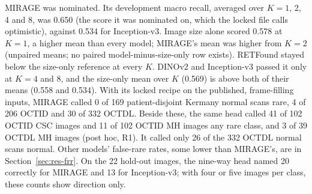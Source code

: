 \documentclass[conference]{IEEEtran}
\begin{document}
MIRAGE was nominated. Its development macro recall, averaged over $K=1$, 2, 4 and 8, was 0.650 (the score it was nominated on, which the locked file calls optimistic), against 0.534 for Inception-v3.
Image size alone scored 0.578 at $K=1$, a higher mean than every model; MIRAGE's mean was higher from $K=2$ (unpaired means; no paired model-minus-size-only row exists). RETFound stayed below the size-only reference at every $K$. DINOv2 and Inception-v3 passed it only at $K=4$ and 8, and the size-only mean over $K$ (0.569) is above both of their means (0.558 and 0.534).
With its locked recipe on the published, frame-filling inputs, MIRAGE called 0 of 169 patient-disjoint Kermany normal scans rare, 4 of 206 OCTID and 30 of 332 OCTDL. Beside these, the same head called 41 of 102 OCTID CSC images and 11 of 102 OCTID MH images any rare class, and 3 of 39 OCTDL MH images (post hoc, R1). It called only 26 of the 332 OCTDL normal scans normal. Other models' false-rare rates, some lower than MIRAGE's, are in Section~\ref{sec:res-frr}.
On the 22 hold-out images, the nine-way head named 20 correctly for MIRAGE and 13 for Inception-v3; with four or five images per class, these counts show direction only.
\end{document}
